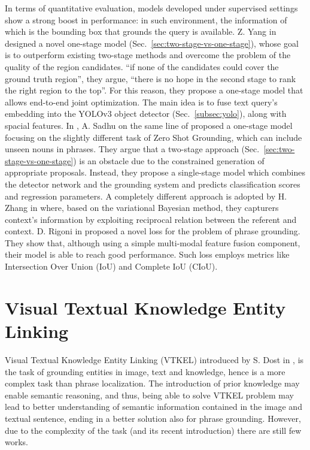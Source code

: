 In terms of quantitative evaluation, models developed under supervised
settings show a strong boost in performance: in such environment, the
information of which is the bounding box that grounds the query is
available. Z. Yang \etal{} in \cite{yang2019fast} designed a novel
one-stage model (Sec.~\ref{sec:two-stage-vs-one-stage}), whose goal is
to outperform existing two-stage methods and overcome the problem of
the quality of the region candidates. ``if none of the candidates
could cover the ground truth region'', they argue, ``there is no hope
in the second stage to rank the right region to the top''. For this
reason, they propose a one-stage model that allows end-to-end joint
optimization. The main idea is to fuse text query's embedding into the
YOLOv3 object detector (Sec.~\ref{subsec:yolo}), along with spacial
features. In \cite{sadhu2019zero}, A. Sadhu \etal{} on the same line
of \cite{yang2019fast} proposed a one-stage model focusing on the
slightly different task of Zero Shot Grounding, which can include
unseen nouns in phrases. They argue that a two-stage approach
(Sec.~\ref{sec:two-stage-vs-one-stage}) is an obstacle due to the
constrained generation of appropriate proposals. Instead, they propose
a single-stage model which combines the detector network and the
grounding system and predicts classification scores and regression
parameters. A completely different approach is adopted by H. Zhang
\etal{} in \cite{zhang2018grounding} where, based on the variational
Bayesian method, they capturers context's information by exploiting
reciprocal relation between the referent and context. D. Rigoni
\etal{} in \cite{rigoni2021better} proposed a novel loss for the
problem of phrase grounding. They show that, although using a simple
multi-modal feature fusion component, their model is able to reach
good performance. Such loss employs metrics like Intersection Over
Union (IoU) and Complete IoU (CIoU).

\section{Visual Textual Knowledge Entity Linking}
\label{sec:vtkel}

Visual Textual Knowledge Entity Linking (VTKEL) introduced by S. Dost
\etal{} in \cite{dost2020jointly, dost2020vtkel, dost2020visual}, is
the task of grounding entities in image, text and knowledge, hence is
a more complex task than phrase localization. The introduction of
prior knowledge may enable semantic reasoning, and thus, being able to
solve VTKEL problem may lead to better understanding of semantic
information contained in the image and textual sentence, ending in a
better solution also for phrase grounding. However, due to the
complexity of the task (and its recent introduction) there are still
few works. 

